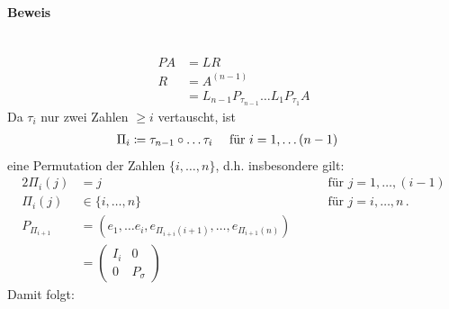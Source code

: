 \documentclass[ngerman,fontsize=11pt, paper=a4, parskip=false, titlepage=false, toc=bib]{scrbook}
\begin{document}
\paragraph{Beweis}~	
	\begin{align*}
		PA &= LR  \\
		R &= A^{(n-1)}\\& = L_{n-1}P_{\tau_{n-1}}\dots L_1P_{\tau_1}A
		\end{align*}
	Da $\tau_i$ nur zwei Zahlen $\geq i $ vertauscht, ist
	\begin{align*}\index{Vorwärtselimination}
		\Pi_i  &\coloneqq \tau_{n-1} \circ \dots \tau_i \quad\text{ für } i=1,\dots (n-1) 
		\end{align*}
	eine Permutation der Zahlen $\{i,\dots, n\}$, d.h. insbesondere gilt:
	\begin{alignat*}{2}
		\Pi_i(j)&=j  & \quad &\text{ für } j=1,\dots,(i-1) \\
		\Pi_i(j)&\in \{i, \dots, n\} & &\text{~für~}j=i,\dots, n\,. \\
		P _{\Pi_{i+1}}  &= (e_1, \dotsc e_i, e_{\Pi_{i+i}(i+1)}, \dotsc, e_{\Pi_{i+1}(n)}) && \\
								&= \begin{pmatrix}
										I_i & 0 \\
										0 & P_{\sigma}
								\end{pmatrix}
	\end{alignat*}
	Damit folgt:
\end{document}

